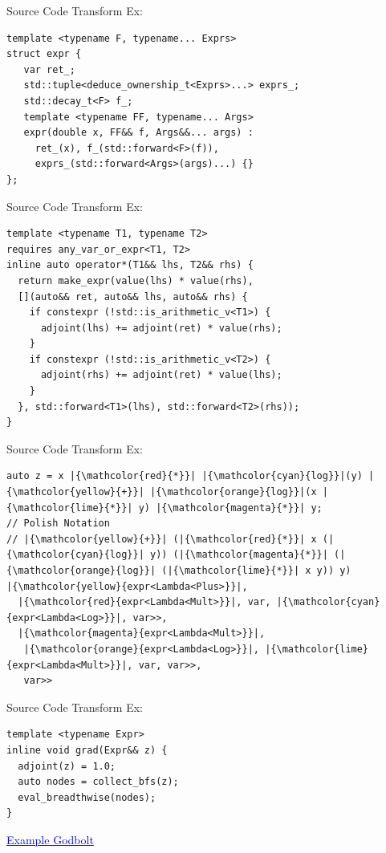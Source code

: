 \documentclass[dvipsnames]{beamer}
\makeatletter
\def\mathcolor#1#{\@mathcolor{#1}}
\def\@mathcolor#1#2#3{%
  \protect\leavevmode
  \begingroup
    \color#1{#2}#3%
  \endgroup
}
\makeatother
\begin{document}
\begin{frame}[fragile]{Source Code Transform Ex:}
\begin{verbatim}
template <typename F, typename... Exprs>
struct expr {
   var ret_;
   std::tuple<deduce_ownership_t<Exprs>...> exprs_;
   std::decay_t<F> f_;
   template <typename FF, typename... Args>
   expr(double x, FF&& f, Args&&... args) :
     ret_(x), f_(std::forward<F>(f)),
     exprs_(std::forward<Args>(args)...) {}
};
\end{verbatim}
\end{frame}

\begin{frame}[fragile]{Source Code Transform Ex:}
\begin{verbatim}
template <typename T1, typename T2>
requires any_var_or_expr<T1, T2>
inline auto operator*(T1&& lhs, T2&& rhs) {
  return make_expr(value(lhs) * value(rhs),
  [](auto&& ret, auto&& lhs, auto&& rhs) {
    if constexpr (!std::is_arithmetic_v<T1>) {
      adjoint(lhs) += adjoint(ret) * value(rhs);
    }
    if constexpr (!std::is_arithmetic_v<T2>) {
      adjoint(rhs) += adjoint(ret) * value(lhs);
    }
  }, std::forward<T1>(lhs), std::forward<T2>(rhs));
}
\end{verbatim}
\end{frame}

\begin{frame}[fragile]{Source Code Transform Ex:}
\begin{verbatim}
auto z = x |{\mathcolor{red}{*}}| |{\mathcolor{cyan}{log}}|(y) |{\mathcolor{yellow}{+}}| |{\mathcolor{orange}{log}}|(x |{\mathcolor{lime}{*}}| y) |{\mathcolor{magenta}{*}}| y;
// Polish Notation
// |{\mathcolor{yellow}{+}}| (|{\mathcolor{red}{*}}| x (|{\mathcolor{cyan}{log}}| y)) (|{\mathcolor{magenta}{*}}| (|{\mathcolor{orange}{log}}| (|{\mathcolor{lime}{*}}| x y)) y)
|{\mathcolor{yellow}{expr<Lambda<Plus>}}|,
  |{\mathcolor{red}{expr<Lambda<Mult>}}|, var, |{\mathcolor{cyan}{expr<Lambda<Log>}}|, var>>,
  |{\mathcolor{magenta}{expr<Lambda<Mult>}}|,
   |{\mathcolor{orange}{expr<Lambda<Log>}}|, |{\mathcolor{lime}{expr<Lambda<Mult>}}|, var, var>>,
   var>>
\end{verbatim}
\end{frame}

\begin{frame}[fragile]{Source Code Transform Ex:}
\begin{verbatim}
template <typename Expr>
inline void grad(Expr&& z) {
  adjoint(z) = 1.0;
  auto nodes = collect_bfs(z);
  eval_breadthwise(nodes);
}
\end{verbatim}
\centerline{\href{https://godbolt.org/z/veexMT5vz}{\textcolor{blue}{Example Godbolt}}}
\end{frame}
\end{document}
